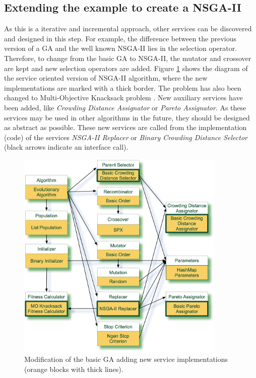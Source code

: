 \subsection{Extending the example to create a NSGA-II}
\label{subsec:osgiliath:nsga2}

As this is a iterative and incremental approach, other services can be discovered and designed in this step. For example, the difference between the previous version of a GA and the well known NSGA-II lies in the selection operator. Therefore, to change from the basic GA to NSGA-II, the mutator and crossover are kept and new selection operators are added. Figure \ref{fig:nsga2} shows the diagram of the service oriented version of NSGA-II algorithm, where the new implementations are marked with a thick border. The problem has also been changed to Multi-Objective Knacksack problem \cite{zitzler1999multiobjective}. New auxiliary services have been added, like {\em Crowding Distance Assignator} or {\em Pareto Assignator}. As these services may be used in other algorithms in the future, they should be designed as abstract as possible. These new services are called from the implementation (code) of the services {\em NSGA-II Replacer} or {\em Binary Crowding Distance Selector} (black arrows indicate an interface call). 




\begin{figure}
\centering
\includegraphics[width=10cm]{gfx/soaea/nsga2.jpg}
\caption{Modification of the basic GA adding new service implementations (orange blocks with thick lines).}
\label{fig:nsga2}
\end{figure}



